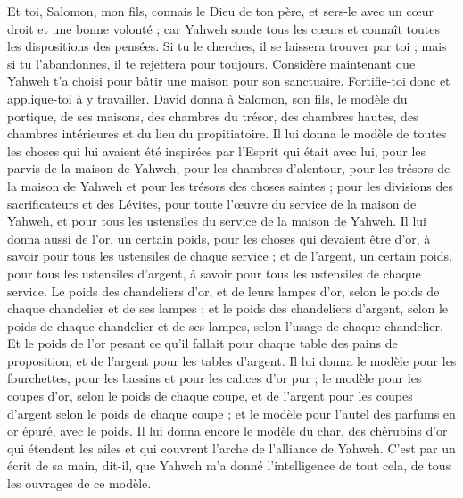 \begin{multicols}{2}
Et toi, Salomon, mon fils, connais le Dieu de ton père, et sers-le avec un cœur droit et une bonne volonté ; car Yahweh sonde tous les cœurs et connaît toutes les dispositions des pensées. Si tu le cherches, il se laissera trouver par toi ; mais si tu l'abandonnes, il te rejettera pour toujours.
Considère maintenant que Yahweh t'a choisi pour bâtir une maison pour son sanctuaire. Fortifie-toi donc et applique-toi à y travailler.
David donna à Salomon, son fils, le modèle du portique, de ses maisons, des chambres du trésor, des chambres hautes, des chambres intérieures et du lieu du propitiatoire.
Il lui donna le modèle de toutes les choses qui lui avaient été inspirées par l'Esprit qui était avec lui, pour les parvis de la maison de Yahweh, pour les chambres d'alentour, pour les trésors de la maison de Yahweh et pour les trésors des choses saintes ;
pour les divisions des sacrificateurs et des Lévites, pour toute l'œuvre du service de la maison de Yahweh, et pour tous les ustensiles du service de la maison de Yahweh.
Il lui donna aussi de l'or, un certain poids, pour les choses qui devaient être d'or, à savoir pour tous les ustensiles de chaque service ; et de l'argent, un certain poids, pour tous les ustensiles d'argent, à savoir pour tous les ustensiles de chaque service.
Le poids des chandeliers d'or, et de leurs lampes d'or, selon le poids de chaque chandelier et de ses lampes ; et le poids des chandeliers d'argent, selon le poids de chaque chandelier et de ses lampes, selon l'usage de chaque chandelier.
Et le poids de l'or pesant ce qu'il fallait pour chaque table des pains de proposition; et de l'argent pour les tables d'argent.
Il lui donna le modèle pour les fourchettes, pour les bassins et pour les calices d'or pur ; le modèle pour les coupes d'or, selon le poids de chaque coupe, et de l'argent pour les coupes d'argent selon le poids de chaque coupe ;
et le modèle pour l'autel des parfums en or épuré, avec le poids. Il lui donna encore le modèle du char, des chérubins d'or qui étendent les ailes et qui couvrent l'arche de l'alliance de Yahweh.
C'est par un écrit de sa main, dit-il, que Yahweh m'a donné l'intelligence de tout cela, de tous les ouvrages de ce modèle.

\end{multicols}
